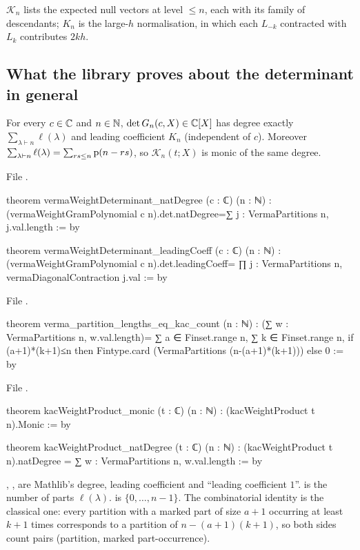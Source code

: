\begin{physics}
$\mathcal K_n$ lists the expected null vectors at level $\le n$, each with its family of descendants;
$K_n$ is the large-$h$ normalisation, in which each $L_{-k}$ contracted with $L_k$ contributes $2kh$.
\end{physics}

\subsection{What the library proves about the determinant in general}

\begin{theorem}\label{l06:thm:degree}
For every $c\in{\mathbb{C}}$ and $n\in{\mathbb{N}}$, $\det G_n(c,X)\in{\mathbb{C}}[X]$ has degree exactly $\sum_{\lambda\vdash n}\ell(\lambda)$
and leading coefficient $K_n$ (independent of $c$). Moreover
$\sum_{\lambda\vdash n}\ell(\lambda) = \sum_{rs\le n}\mathrm{p}(n-rs)$, so $\mathcal K_n(t;X)$ is monic of the same
degree.
\end{theorem}

File .
\begin{leancode}
theorem vermaWeightDeterminant_natDegree (c : ℂ) (n : ℕ) :
    (vermaWeightGramPolynomial c n).det.natDegree=∑ j : VermaPartitions n, j.val.length := by

theorem vermaWeightDeterminant_leadingCoeff (c : ℂ) (n : ℕ) :
    (vermaWeightGramPolynomial c n).det.leadingCoeff=
      ∏ j : VermaPartitions n, vermaDiagonalContraction j.val := by
\end{leancode}
File .
\begin{leancode}
theorem verma_partition_lengths_eq_kac_count (n : ℕ) :
    (∑ w : VermaPartitions n, w.val.length)=
      ∑ a ∈ Finset.range n, ∑ k ∈ Finset.range n,
        if (a+1)*(k+1)≤n then
          Fintype.card (VermaPartitions (n-(a+1)*(k+1))) else 0 := by
\end{leancode}
File .
\begin{leancode}
theorem kacWeightProduct_monic (t : ℂ) (n : ℕ) : (kacWeightProduct t n).Monic := by

theorem kacWeightProduct_natDegree (t : ℂ) (n : ℕ) :
    (kacWeightProduct t n).natDegree = ∑ w : VermaPartitions n, w.val.length := by
\end{leancode}

\begin{dictionary}
, ,  are Mathlib's degree, leading coefficient and
``leading coefficient $1$''.  is the number of parts $\ell(\lambda)$.
 is $\{0,\dots,n-1\}$. The combinatorial identity is the classical one: every
partition with a marked part of size $a+1$ occurring at least $k+1$ times corresponds to a partition of
$n-(a+1)(k+1)$, so both sides count pairs (partition, marked part-occurrence).
\end{dictionary}

